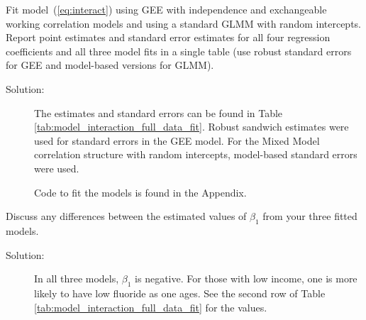 \documentclass[11pt, letterpaper]{article}
\begin{document}
\begin{enumerate}[(a)]
{\em \item  Fit model~(\ref{eq:interact}) using GEE with independence and exchangeable working
correlation models and using a standard GLMM with random intercepts.  Report point estimates and standard error estimates 
for all four regression coefficients and all three model fits in a single table (use robust standard errors for GEE and model-based versions for GLMM).}

\begin{table}[ht]
  \scriptsize
  \centering
  
  \caption{Model fits of Equation \ref{eq:interact} with different correlation
    structures to the data in \texttt{fluoride.csv}.}
  \label{tab:model_interaction_full_data_fit}
\end{table}

\begin{description}
\item[Solution:] The estimates and standard errors can be found in Table
  \ref{tab:model_interaction_full_data_fit}. Robust sandwich estimates were used
  for standard errors in the GEE model. For the Mixed Model correlation
  structure with random intercepts, model-based standard errors were used.

  Code to fit the models is found in the Appendix.
\end{description}
{\em \item Discuss any differences between the estimated values of $\beta_1$ from your three fitted models.}
\begin{description}
\item[Solution:] In all three models, $\beta_1$ is negative. For those with low
  income, one is more likely to have low fluoride as one ages. See the second
  row of Table \ref{tab:model_interaction_full_data_fit} for the values.


\end{description}
\end{enumerate}
\end{document}
